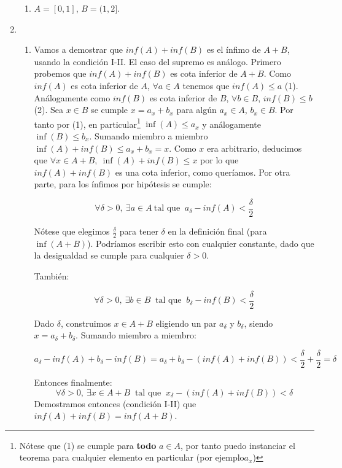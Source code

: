 \documentclass[10pt,a4paper]{article}
\begin{document}
\begin{enumerate}
\begin{enumerate}
  \item
    $A = [0,1]$, $B=(1,2]$.
  \end{enumerate}
\newpage
\item
  \begin{enumerate}
  \item Vamos a demostrar que $inf(A) + inf(B)$ es el \'infimo de $A+B$,
    usando la condici\'on I-II. El caso del supremo es an\'alogo.
    Primero probemos que $inf(A)+inf(B)$ es cota inferior de $A+B$.
    Como $inf(A)$ es cota inferior de $A$, $\forall a \in A$ tenemos que
    $inf(A) \leq a$ (1). An\'alogamente como $inf(B)$ es cota inferior de $B$,
    $\forall b \in B$, $inf(B) \leq b$ (2).
    Sea $x \in B$ se cumple $x = a_x+b_x$ para alg\'un $a_x\in A$, $b_x \in B$.
    Por tanto 
    por (1), en particular\footnote{N\'otese que (1) se cumple para {\bf todo} 
      $a \in A$, por tanto puedo instanciar el teorema para cualquier
      elemento en particular (por ejemplo$a_x$) }
    $\inf(A) \leq a_x$ y an\'alogamente
    $\inf(B) \leq b_x$. Sumando miembro a miembro
    $\inf(A)+ inf(B) \leq a_x + b_x = x$. Como $x$ era arbitrario,
    deducimos que $\forall x \in A+B, \: \inf(A)+ inf(B) \leq x$ por lo que
    $inf(A)+inf(B)$ es una cota inferior, como quer\'iamos.
    \noindent
    Por otra parte, para los \'infimos por hip\'otesis
    se cumple:

    $$\forall \delta>0, \: \exists a \in A \: \text{tal que }
    \: a_{\delta} - inf(A) < \frac{\delta}{2} $$

    Nótese que elegimos $\frac{\delta}{2}$ para tener $\delta$
    en la definici\'on
    final (para $\inf(A+B)$). Podríamos escribir esto con
    cualquier constante, dado que la desigualdad se cumple para cualquier
    $\delta>0$.

    Tambi\'en:

    $$\forall \delta>0, \: \exists b \in B \: \text{ tal que }
    \: b_{\delta} - inf(B) < \frac{\delta}{2} $$
    
    Dado $\delta$, construimos $x \in A+B$ eligiendo un par $a_{\delta}$
    y $b_{\delta}$, siendo $ x= a_{\delta}+ b_{\delta}$. Sumando miembro a miembro:

    $$
    a_{\delta} - inf(A) + b_{\delta} - inf(B)
    = a_{\delta} + b_{\delta} - (inf(A) + inf (B))
    < \frac{\delta}{2} + \frac{\delta}{2}= \delta
    $$

    Entonces finalmente:
    $$\forall \delta > 0, \: \exists x \in A+B \: \text{ tal que }
    \: x_{\delta} - (inf(A)+inf(B)) < \delta $$
    Demostramos entonces (condici\'on I-II) que $inf(A)+inf(B) = inf (A+B)$.
    

\end{enumerate}
\end{enumerate}
\end{document}
